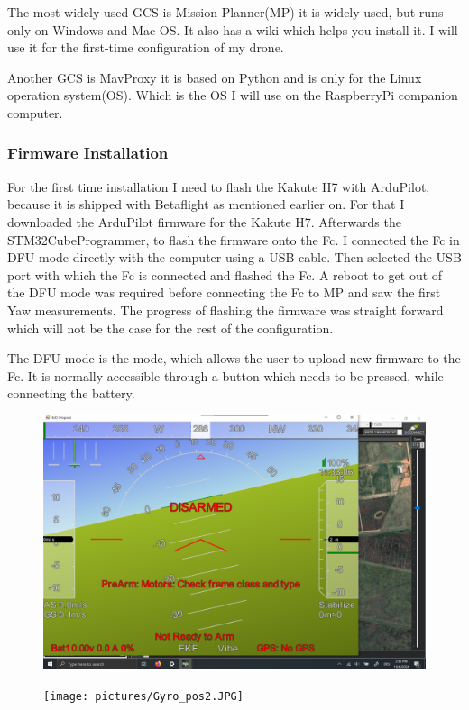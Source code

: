 \documentclass{article}
\begin{document}
	The most widely used GCS is Mission Planner(MP)\cite{MissionPlanner} it is widely used, but runs only on Windows and Mac OS. It also has a wiki which helps you install it. I will use it for the first-time configuration of my drone. 
	
	Another GCS is MavProxy it is based on Python and is only for the Linux operation system(OS). Which is the OS I will use on the RaspberryPi companion computer. 

	\subsubsection{Firmware Installation}
	
	For the first time installation I need to flash the Kakute H7 with ArduPilot, because it is shipped with Betaflight as mentioned earlier on. For that I downloaded the ArduPilot firmware\cite{ArduPilotFirmware} for the Kakute H7. Afterwards the STM32CubeProgrammer\cite{STM32CubeProgrammer}, to flash the firmware onto the Fc. I connected the Fc in \gls{DFU} mode directly with the computer using a USB cable. Then selected the USB port with which the Fc is connected and flashed the Fc. A reboot to get out of the DFU mode was required before connecting the Fc to MP and saw the first Yaw measurements. The progress of flashing the firmware was straight forward which will not be the case for the rest of the configuration. 
	\begin{Explanation}%
		The \gls{DFU} mode is the mode, which allows the user to upload new firmware to the \gls{Fc}. It is normally accessible through a button which needs to be pressed, while connecting the battery. 

	\end{Explanation}

\begin{figure}[h]
	\centering
	\includegraphics[width=0.7\linewidth]{pictures/Gyro_pos2_large}
	\caption{}
	\label{fig:gyropos2large}
\end{figure}
\begin{figure}[h]
	\centering
	\texttt{[image: pictures/Gyro\_pos2.JPG]}
	\caption{}
	\label{fig:gyropos2}
\end{figure}
\end{document}
